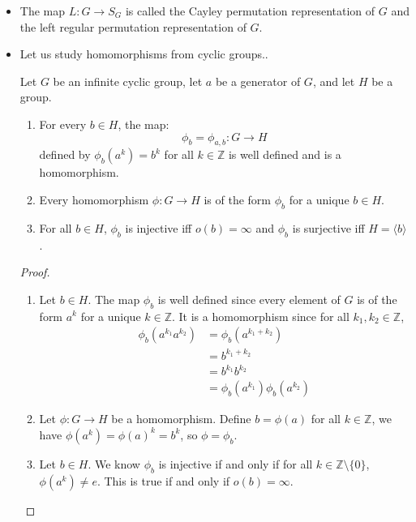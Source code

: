 \begin{itemize}
    \begin{proof}
        We already proved that $L$ is a homomorphism. To prove that $L$ is injective, we must prove that $\ker L = \{e\}$. Let $g\in \ker L$, i.e. $L_g = \id_G$. Therefore $g=ge=L_g(e)=\id_G(e)=e$. Thus $\ker L \subseteq \{e\}$. Since $e\in \ker L$, we have $\ker L = \{e\}$.
    \end{proof}
    \item The map $L:G \rightarrow S_G$ is called the Cayley permutation representation of $G$ and the left regular permutation representation of $G$.
    \item Let us study homomorphisms from cyclic groups..
    \begin{theorem}
        Let $G$ be an infinite cyclic group, let $a$ be a generator of $G$, and let $H$ be a group.
        \begin{enumerate}
            \item For every $b\in H$, the map:
            \begin{equation}
                \phi_b = \phi_{a,b} : G\rightarrow H
            \end{equation}
            defined by $\phi_b(a^k)=b^k$ for all $k\in\mathbb{Z}$ is well defined and is a homomorphism.
            \item Every homomorphism $\phi:G\rightarrow H$ is of the form $\phi_b$ for a unique $b\in H$.
            \item For all $b\in H$, $\phi_b$ is injective iff $o(b)=\infty$ and $\phi_b$ is surjective iff $H=\langle b\rangle$.
        \end{enumerate}
    \end{theorem}
    \begin{proof}
        \begin{enumerate}
            \item Let $b \in H$. The map $\phi_b$ is well defined since every element of $G$ is of the form $a^k$ for a unique $k \in \mathbb{Z}$. It is a homomorphism since for all $k_1,k_2 \in \mathbb{Z}$,
            \begin{align}
                \phi_b(a^{k_1}a^{k_2}) &= \phi_b(a^{k_1+k_2}) \\ 
                &= b^{k_1+k_2} \\ 
                &= b^{k_1}b^{k_2} \\ 
                &= \phi_b(a^{k_1})\phi_b(a^{k_2})
            \end{align}
            \item Let $\phi:G\rightarrow H$ be a homomorphism. Define $b=\phi(a)$ for all $k\in \mathbb{Z}$, we have $\phi(a^k)=\phi(a)^k = b^k$, so $\phi=\phi_b$.
            \item Let $b\in H$. We know $\phi_b$ is injective if and only if for all $k\in \mathbb{Z} \setminus \{0\}$, $\phi(a^k)\neq e$.
            This is true if and only if $o(b)=\infty$.


\end{enumerate}
\end{proof}
\end{itemize}
